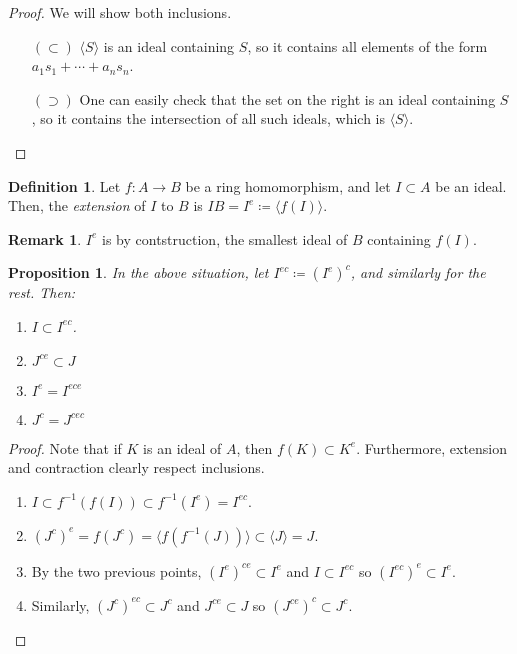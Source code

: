 \documentclass[11pt]{article}
\newtheorem{prop}[theorem]{Proposition}
\theoremstyle{definition}
\newtheorem{defn}[theorem]{Definition}
\newtheorem{rk}[theorem]{Remark}
\begin{document}
            \begin{proof}
                We will show both inclusions.
                \begin{itemize}
                    \item[$(\subset)$] $\langle S \rangle$ is an ideal containing $S$, so it contains all elements of the form $a_1 s_1 + \cdots + a_n s_n$.
                    \item[$(\supset)$] One can easily check that the set on the right is an ideal containing $S$,
                    so it contains the intersection of all such ideals, which is $\langle S \rangle$.
                \end{itemize}
            \end{proof}

        \begin{defn}
            Let $f: A \rightarrow B$ be a ring homomorphism, and let $I \subset A$ be an ideal.
            Then, the \emph{extension} of $ I$ to $B$ is $IB = I^{e} \coloneqq \langle f(I) \rangle$.
        \end{defn}

        \begin{rk}
            $I^{e}$ is by contstruction, the smallest ideal of $B$ containing $f(I)$.
        \end{rk}

        \begin{prop} \label{prop:extension-and-contraction}
            In the above situation, let $I^{ec} \coloneqq (I^e)^c$, and similarly for the rest.
            Then:
            \begin{enumerate}
                \item $I \subset I^{ec}$.
                \item $J^{ce} \subset J$
                \item $I^e = I^{ece}$
                \item $J^c = J^{cec}$
            \end{enumerate}
        \end{prop}

        \begin{proof}
            Note that if $K$ is an ideal of $A$, then $f(K) \subset K^e$.
            Furthermore, extension and contraction clearly respect inclusions.
            \begin{enumerate}
                \item $I \subset f^{-1}(f(I)) \subset f^{-1}(I^e) = I^{ec}$.
                \item $(J^{c})^e = f(J^c) = \langle f(f^{-1}(J))\rangle \subset \langle J  \rangle = J$.

                \item By the two previous points, $(I^e)^{ce} \subset I^e$ and $I\subset I^{ec}$ so
                $(I^{ec})^e \subset I^e$.

                \item Similarly, $(J^c)^{ec} \subset J^c$ and $J^{ce} \subset J$ so
                $(J^{ce})^c \subset J^c$.
            \end{enumerate}
        \end{proof}
\end{document}
